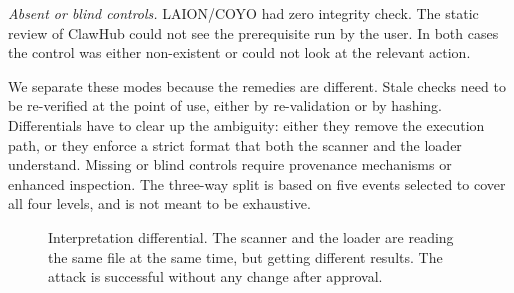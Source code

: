 \documentclass[conference]{IEEEtran}
\begin{document}
\emph{Absent or blind controls.} LAION/COYO had zero integrity check. The static review of ClawHub could not see the prerequisite run by the user. In both cases the control was either non-existent or could not look at the relevant action.

We separate these modes because the remedies are different. Stale checks need to be re-verified at the point of use, either by re-validation or by hashing. Differentials have to clear up the ambiguity: either they remove the execution path, or they enforce a strict format that both the scanner and the loader understand. Missing or blind controls require provenance mechanisms or enhanced inspection. The three-way split is based on five events selected to cover all four levels, and is not meant to be exhaustive.

\begin{figure}[!t]
\centering
{}
\caption{Interpretation differential. The scanner and the loader are reading the same file at the same time, but getting different results. The attack is successful without any change after approval.}
\label{fig:differential}
\end{figure}
\end{document}
